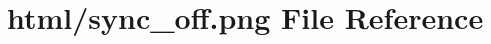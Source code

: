 \hypertarget{sync__off_8png}{}\section{html/sync\+\_\+off.png File Reference}
\label{sync__off_8png}
